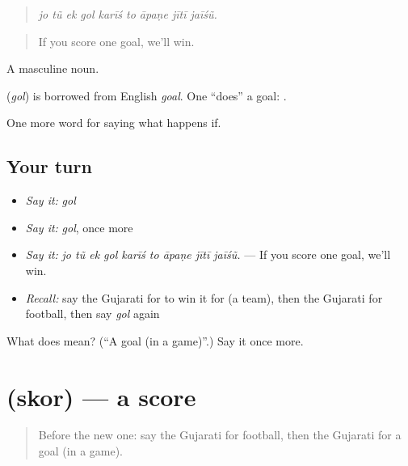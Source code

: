 \begin{quote}
\emph{jo tũ ek gol karīś to āpaṇe jītī jaīśũ.}
\end{quote}

\begin{quote}
If you score one goal, we'll win.
\end{quote}

A masculine noun.

\begin{cousinweb}
\textbf{} (\emph{gol}) is borrowed from English \emph{goal}. One \textquotedblleft{}does\textquotedblright{} a goal: \textbf{ }.
\end{cousinweb}

\begin{grammarlens}[title={What you've built}]
One more word for saying what happens if.
\end{grammarlens}

\subsection*{Your turn}
\begin{itemize}
\raggedright
  \item \emph{Say it:} \emph{gol}
  \item \emph{Say it:} \emph{gol}, once more
  \item \emph{Say it:} \emph{jo tũ ek gol karīś to āpaṇe jītī jaīśũ.} — If you score one goal, we'll win.
  \item \emph{Recall:} say the Gujarati for to win it for (a team), then the Gujarati for football, then say \emph{gol} again
\end{itemize}

\begin{tcolorbox}[breakable,colback=teal!4,colframe=teal!35!black,title={Before you move on}]
What does  mean? (\textquotedblleft{}A goal (in a game)\textquotedblright{}.) Say it once more.
\end{tcolorbox}
\section[\texorpdfstring{\gu{સ્કોર} (skor)}{સ્કોર (skor)}]{ (skor) — a score}

\label{lesson:GU-C549-skor}



\begin{quote}
Before the new one: say the Gujarati for football, then the Gujarati for a goal (in a game).
\end{quote}

